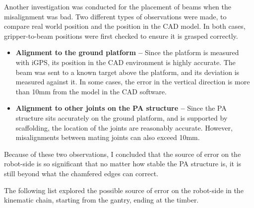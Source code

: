 Another investigation was conducted for the placement of beams when the misalignment was bad. Two different types of observations were made, to compare real world position and the position in the CAD model. In both cases, gripper-to-beam positions were first checked to ensure it is grasped correctly.

\begin{itemize}
	\item \textbf{Alignment to the ground platform --} Since the platform is measured with iGPS, its position in the CAD environment is highly accurate. The beam was sent to a known target above the platform, and its deviation is measured against it. In some cases, the error in the vertical direction is more than 10mm from the model in the CAD software.

	\item \textbf{Alignment to other joints on the PA structure --} Since the PA structure sits accurately on the ground platform, and is supported by scaffolding, the location of the joints are reasonably accurate. However, misalignments between mating joints can also exceed 10mm.

\end{itemize}

Because of these two observations, I concluded that the source of error on the robot-side is so significant that no matter how stable the PA structure is, it is still beyond what the chamfered edges can correct.

The following list explored the possible source of error on the robot-side in the kinematic chain, starting from the gantry, ending at the timber.

